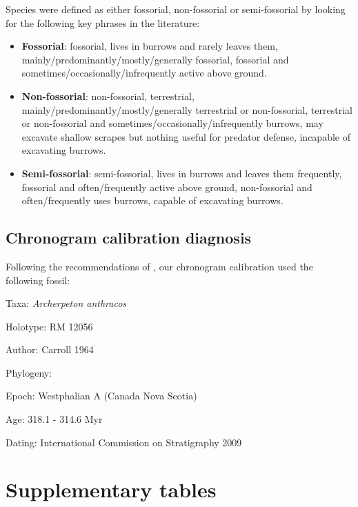 Species were defined as either fossorial, non-fossorial or semi-fossorial by looking for the following key phrases in the literature:
\begin{itemize}
\item \textbf{Fossorial}: fossorial, lives in burrows and rarely leaves them, mainly/predominantly/mostly/generally fossorial, fossorial and sometimes/occasionally/infrequently active above ground. 
\item \textbf{Non-fossorial}: non-fossorial, terrestrial, mainly/predominantly/mostly/generally terrestrial or non-fossorial, terrestrial or non-fossorial and sometimes/occasionally/infrequently burrows, may excavate shallow scrapes but nothing useful for predator defense, incapable of excavating burrows.
\item \textbf{Semi-fossorial}: semi-fossorial, lives in burrows and leaves them frequently, fossorial and often/frequently active above ground, non-fossorial and often/frequently uses burrows, capable of excavating burrows.
\end{itemize}


\subsection{Chronogram calibration diagnosis}

Following the recommendations of \cite{parham2011best}, our chronogram calibration used the following fossil:


Taxa: \textit{Archerpeton anthracos}

Holotype: RM 12056

Author: Carroll 1964

Phylogeny: \citep{reisz2004molecular}

Epoch: Westphalian A (Canada Nova Scotia)

Age: 318.1 - 314.6 Myr

Dating: International Commission on Stratigraphy 2009

\newpage
\section{Supplementary tables}

